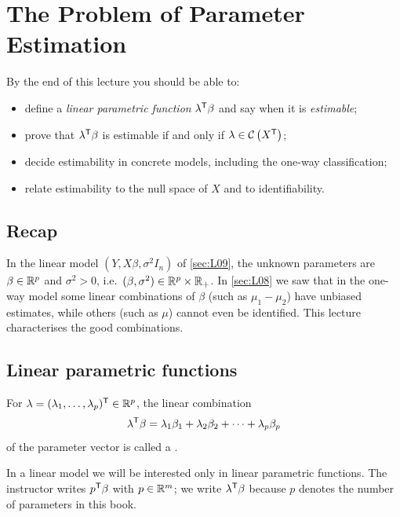 \section{The Problem of Parameter Estimation}\label{sec:L10}


\begin{guiding*}
By the end of this lecture you should be able to:
\begin{itemize}
  \item define a \emph{linear parametric function} $\lambda^{\mathsf T}\beta$ and say when it is \emph{estimable};
  \item prove that $\lambda^{\mathsf T}\beta$ is estimable if and only if $\lambda\in\mathcal{C}\left(X^{\mathsf T}\right)$;
  \item decide estimability in concrete models, including the one-way classification;
  \item relate estimability to the null space of $X$ and to identifiability.
\end{itemize}
\end{guiding*}

\subsection{Recap}
In the linear model $(Y,X\beta,\sigma^2I_n)$ of \cref{sec:L09}, the unknown parameters are
$\beta\in\mathbb R^p$ and $\sigma^2>0$, i.e.\ $(\beta,\sigma^2)\in\mathbb R^p\times\mathbb R_+$. In
\cref{sec:L08} we saw that in the one-way model some linear combinations of $\beta$ (such as
$\mu_1-\mu_2$) have unbiased estimates, while others (such as $\mu$) cannot even be identified.
This lecture characterises the good combinations.

\subsection{Linear parametric functions}
\begin{definition}\label{def:L10-lpf}
For $\lambda=(\lambda_1,\dots,\lambda_p)^{\mathsf T}\in\mathbb R^p$, the linear combination
\[
\lambda^{\mathsf T}\beta=\lambda_1\beta_1+\lambda_2\beta_2+\dots+\lambda_p\beta_p
\]
of the parameter vector is called a .
\end{definition}
In a linear model we will be interested only in linear parametric functions. The instructor
writes $p^{\mathsf T}\beta$ with $p\in\mathbb R^m$; we write $\lambda^{\mathsf T}\beta$ because $p$ denotes the number of
parameters in this book.

